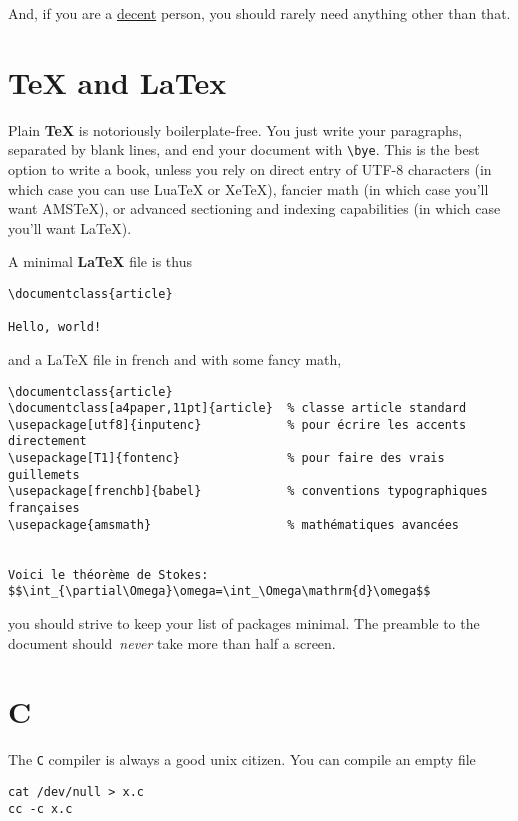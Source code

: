 And, if you are a \href{http://motherfuckingwebsite.com/}{decent} person, you
should rarely need anything other than that.

\section{TeX and LaTex}

Plain {\bf TeX} is notoriously boilerplate-free.  You just write your
paragraphs, separated by blank lines, and end your document with \verb+\bye+.
This is the best option to write a book, unless you rely on direct entry of
UTF-8 characters (in which case you can use LuaTeX or XeTeX), fancier math
(in which case you'll want AMSTeX), or advanced sectioning and
indexing capabilities (in which case you'll want LaTeX).

A minimal {\bf LaTeX} file is thus
\begin{verbatim}
\documentclass{article}

Hello, world!

\end{verbatim}

and a LaTeX file in french and with some fancy math,

\begin{verbatim}
\documentclass{article}
\documentclass[a4paper,11pt]{article}  % classe article standard
\usepackage[utf8]{inputenc}            % pour écrire les accents directement
\usepackage[T1]{fontenc}               % pour faire des vrais guillemets
\usepackage[frenchb]{babel}            % conventions typographiques françaises
\usepackage{amsmath}                   % mathématiques avancées


Voici le théorème de Stokes:
$$\int_{\partial\Omega}\omega=\int_\Omega\mathrm{d}\omega$$

\end{verbatim}

you should strive to keep your list of packages minimal.  The preamble to the
document should~\emph{never} take more than half a screen.


\section{C}

The \verb+C+ compiler is always a good unix citizen.  You can compile an
empty file

\begin{verbatim}
cat /dev/null > x.c
cc -c x.c
\end{verbatim}

